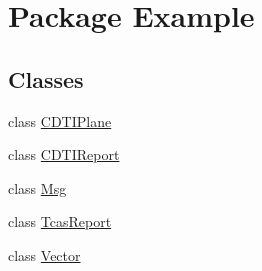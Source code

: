 \hypertarget{namespace_example}{}\section{Package Example}
\label{namespace_example}
\subsection*{Classes}
\begin{DoxyCompactItemize}
\item 
class \hyperlink{class_example_1_1_c_d_t_i_plane}{C\+D\+T\+I\+Plane}
\item 
class \hyperlink{class_example_1_1_c_d_t_i_report}{C\+D\+T\+I\+Report}
\item 
class \hyperlink{class_example_1_1_msg}{Msg}
\item 
class \hyperlink{class_example_1_1_tcas_report}{Tcas\+Report}
\item 
class \hyperlink{class_example_1_1_vector}{Vector}
\end{DoxyCompactItemize}
